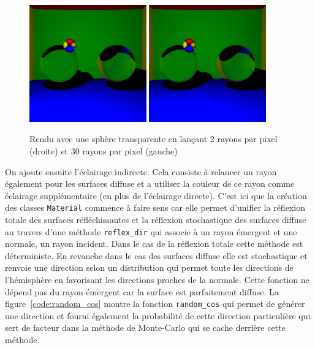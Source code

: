 \documentclass[12pt]{article}
\newcommand\id[1]{\texttt{#1}}
\begin{document}
\begin{figure}[ht]
  \centering
  \includegraphics[width=0.45\textwidth]{pic/step6_2r}
  \includegraphics[width=0.45\textwidth]{pic/step6_30r}
  \caption{Rendu avec une sphère transparente en lançant 2 rayons par pixel (droite) et 30 rayons par pixel (gauche)}\label{fig:step6.5}
\end{figure}

On ajoute ensuite l'éclairage indirecte.
Cela consiste à relancer un rayon également pour les surfaces diffuse et a utiliser la couleur de ce rayon comme éclairage supplémentaire (en plus de l'éclairage directe).
C'est ici que la création des classes \id{Material} commence à faire sens car elle permet d'unifier la réflexion totale des surfaces réfléchissantes et la réflexion stochastique des surfaces diffuse au travers d'une méthode \id{reflex\_dir} qui associe à un rayon émergent et une normale, un rayon incident.
Dans le cas de la réflexion totale cette méthode est déterministe.
En revanche dans le cas des surfaces diffuse elle est stochastique et renvoie une direction selon un distribution qui permet toute les directions de l'hémisphère en favorisant les directions proches de la normale.
Cette fonction ne dépend pas du rayon émergent car la surface est parfaitement diffuse.
La figure~\ref{code:random_cos} montre la fonction \id{random\_cos} qui permet de générer une direction et fourni également la probabilité de cette direction particulière qui sert de facteur dans la méthode de Monte-Carlo qui se cache derrière cette méthode.
\end{document}
